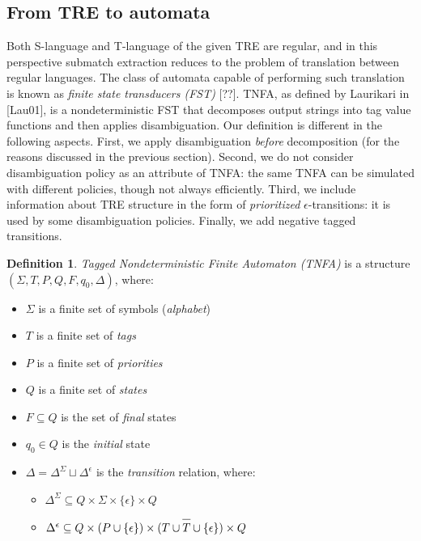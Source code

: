 \documentclass{article}
\newcommand{\Xeq}{\!=\!}
\newcommand*{\Xbar}[1]{\overline{#1\vphantom{\bar{#1}}}}
\theoremstyle{definition}
\newtheorem{Xdef}{Definition}
\begin{document}
\begin{multicols}{2}
\section{From TRE to automata}\label{section_tnfa}

Both S-language and T-language of the given TRE are regular,
and in this perspective submatch extraction reduces to the problem of translation between regular languages.
The class of automata capable of performing such translation is known as \emph{finite state transducers (FST)} [??].
TNFA, as defined by Laurikari in [Lau01], is a nondeterministic FST
that decomposes output strings into tag value functions
and then applies disambiguation.
Our definition is different in the following aspects.
First, we apply disambiguation \emph{before} decomposition
(for the reasons discussed in the previous section).
Second, we do not consider disambiguation policy as an attribute of TNFA:
the same TNFA can be simulated with different policies, though not always efficiently.
Third, we include information about TRE structure in the form of \emph{prioritized} $\epsilon$-transitions:
it is used by some disambiguation policies.
Finally, we add negative tagged transitions.

    \begin{Xdef}
    \emph{Tagged Nondeterministic Finite Automaton (TNFA)}
    is a structure $(\Sigma, T, P, Q, F, q_0, \Delta)$, where:
    \begin{itemize}
    \setlength{\parskip}{0.5em}
        \item[] $\Sigma$ is a finite set of symbols (\emph{alphabet})
        \item[] $T$ is a finite set of \emph{tags}
        \item[] $P$ is a finite set of \emph{priorities}
        \item[] $Q$ is a finite set of \emph{states}
        \item[] $F \subseteq Q$ is the set of \emph{final} states
        \item[] $q_0 \in Q$ is the \emph{initial} state

        \item[] $\Delta \Xeq \Delta^\Sigma \sqcup \Delta^\epsilon$ is the \emph{transition} relation, where:
        \begin{itemize}
            \item[] $\Delta^\Sigma \subseteq Q \times \Sigma \times \{\epsilon\} \times Q$
            \item[] $\Delta^\epsilon \subseteq Q \times (P \cup \{\epsilon\}) \times (T \cup \Xbar{T} \cup \{\epsilon\}) \times Q$
        \end{itemize}


\end{itemize}
\end{Xdef}
\end{multicols}
\end{document}
